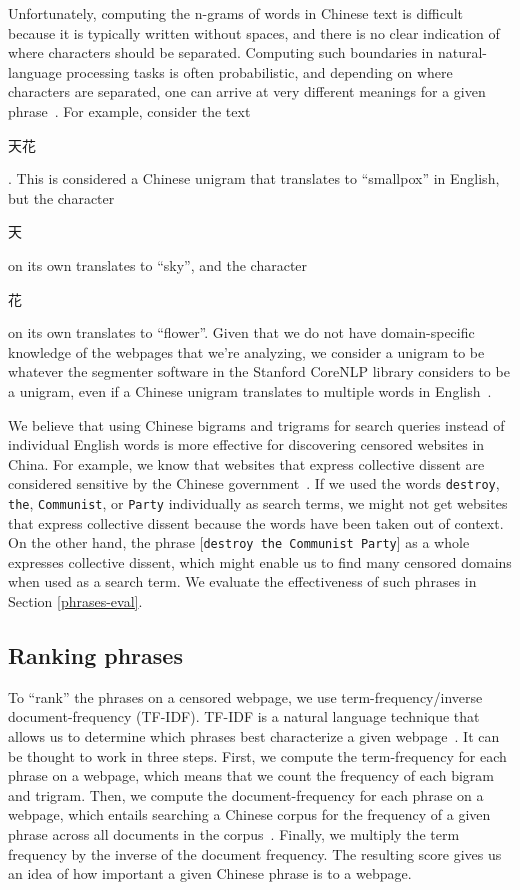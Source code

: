 Unfortunately, computing the n-grams of words in Chinese text is
difficult because it is typically written without spaces, and there is
no clear indication of where characters should be separated. Computing
such boundaries in natural-language processing tasks is often
probabilistic, and depending on where characters are separated, one
can arrive at very different meanings for a given
phrase~\cite{stanford:segmenter}. For example, consider the
text \begin{CJK*}{UTF8}{gbsn}天花\end{CJK*}. This is considered a
Chinese unigram that translates to
``smallpox'' in English, but the character \begin{CJK*}{UTF8}{gbsn}
天\end{CJK*} on its own translates to ``sky'', and the
character \begin{CJK*}{UTF8}{gbsn}花\end{CJK*} on its own translates
to ``flower''. Given that we do not have domain-specific knowledge of
the webpages that we're analyzing, we consider a unigram to be
whatever the segmenter software in the Stanford CoreNLP library considers to be
a unigram, even if a Chinese unigram translates to multiple words in
English~\cite{tseng2005conditional, chang2008optimizing}.

We believe that using Chinese bigrams and trigrams for search queries
instead of individual English words is more effective for discovering
censored websites in China. For example, we know that websites that
express collective dissent are considered sensitive by the Chinese
government~\cite{king2013censorship}. If we used the words
\texttt{destroy}, \texttt{the}, \texttt{Communist}, or \texttt{Party}
individually as search terms, we might not get websites that express
collective dissent because the words have been taken out of
context. On the other hand, the phrase [\texttt{destroy the Communist
Party}] as a whole expresses collective dissent, which might enable us
to find many censored domains when used as a search term. We evaluate
the effectiveness of such phrases in Section \ref{phrases-eval}.

\subsection{Ranking phrases} \label{tf-idf}
To ``rank'' the phrases on a censored webpage, we use
term-frequency/inverse document-frequency (TF-IDF). TF-IDF is a
natural language technique that allows us to determine which phrases
best characterize a given webpage~\cite{ramos2003using}. It can be thought to work in three
steps. First, we compute the term-frequency for each phrase on a
webpage, which means that we count the frequency of each bigram and
trigram. Then, we compute the document-frequency for each phrase on a
webpage, which entails searching a Chinese corpus for the frequency of
a given phrase across all documents in the
corpus~\cite{phrasefinder}. Finally, we multiply the term frequency by
the inverse of the document frequency. The resulting score gives us an
idea of how important a given Chinese phrase is to a webpage.

